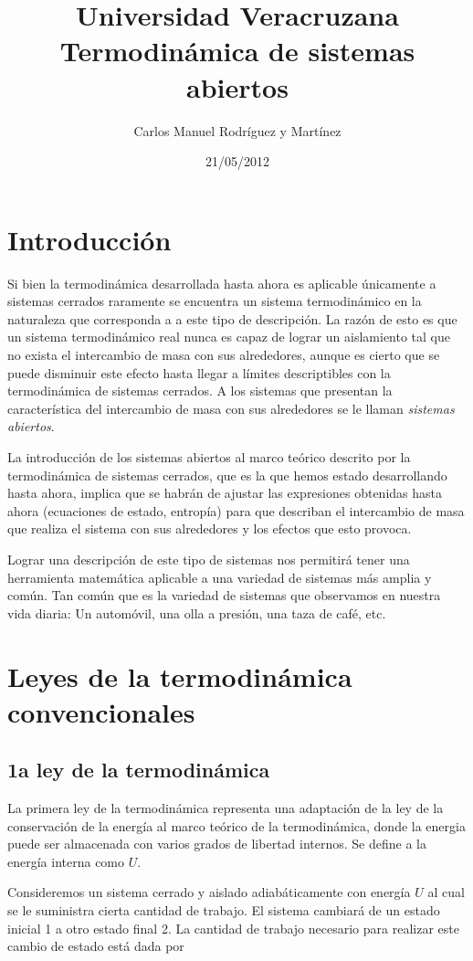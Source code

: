 \documentclass[a4paper,12pt]{article}
\title{ \Huge Universidad Veracruzana\\[1in]
		\Huge Termodinámica de sistemas abiertos}
\author{Carlos Manuel Rodríguez y Martínez}
\date{21/05/2012}
\begin{document}
\maketitle
\newpage

\tableofcontents

\section{Introducción}
Si bien la termodinámica desarrollada hasta ahora es aplicable únicamente a sistemas cerrados raramente se encuentra un sistema termodinámico en la naturaleza que corresponda a a este tipo de descripción. La razón de esto es que un sistema termodinámico real nunca es capaz de lograr un aislamiento tal que no exista el intercambio de masa con sus alrededores, aunque es cierto que se puede disminuir este efecto hasta llegar a límites descriptibles con la termodinámica de sistemas cerrados. A los sistemas que presentan la característica del intercambio de masa con sus alrededores se le llaman \textit{sistemas abiertos}.

La introducción de los sistemas abiertos al marco teórico descrito por la termodinámica de sistemas cerrados, que es la que hemos estado desarrollando hasta ahora, implica que se habrán de ajustar las expresiones obtenidas hasta ahora (ecuaciones de estado, entropía) para que describan el intercambio de masa que realiza el sistema con sus alrededores y los efectos que esto provoca.

Lograr una descripción de este tipo de sistemas nos permitirá tener una herramienta matemática aplicable a una variedad de sistemas más amplia y común. Tan común que es la variedad de sistemas que observamos en nuestra vida diaria: Un automóvil, una olla a presión, una taza de café, etc.

\section{Leyes de la termodinámica convencionales}
\subsection{1a ley de la termodinámica}
La primera ley de la termodinámica representa una adaptación de la ley de la conservación de la energía al marco teórico de la termodinámica, donde la energia puede ser almacenada con varios grados de libertad internos. Se define a la energía interna como $U$.

Consideremos un sistema cerrado y aislado adiabáticamente con energía $U$ al cual se le suministra cierta cantidad de trabajo. El sistema cambiará de un estado inicial 1 a otro estado final 2. La cantidad de trabajo necesario para realizar este cambio de estado está dada por
\end{document}
